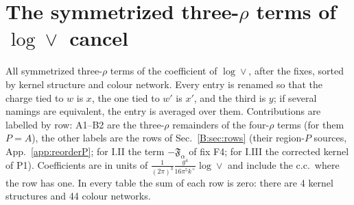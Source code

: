 \documentclass[10pt]{article}
\numberwithin{equation}{section}
\begin{document}

\section{The symmetrized three-\texorpdfstring{$\rho$}{rho} terms of \texorpdfstring{$\log\vee$}{log vee} cancel}\label{B:sec:three}
All symmetrized three-$\rho$ terms of the coefficient of $\log\vee$, after the fixes, sorted by kernel structure and colour network. Every entry is renamed so that the charge tied to $w$ is $x$, the one tied to $w'$ is $x'$, and the third is $y$; if several namings are equivalent, the entry is averaged over them. Contributions are labelled by row: A1--B2 are the three-$\rho$ remainders of the four-$\rho$ terms (for them $P=A$), the other labels are the rows of Sec.~\ref{B:sec:rows} (their region-$P$ sources, App.~\ref{app:reorderP}; for I.II the term $-\mathfrak F_\alpha$ of fix F4; for I.III the corrected kernel of P1). Coefficients are in units of $\frac{1}{(2\pi)^3}\frac{g^4}{16\pi^5k^+}\log\vee$ and include the c.c.\ where the row has one. In every table the sum of each row is zero: there are 4 kernel structures and 44 colour networks.
\end{document}
